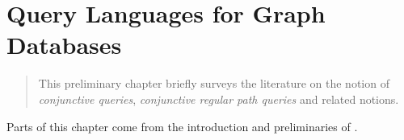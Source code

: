 \chapter{Query Languages for Graph Databases}
\label{ch:prelim-graph-databases}
\renewcommand\thefigure{\thechapter.\arabic{figure}}

\begin{chapterpresentation}
	\begin{abstract}
		This preliminary chapter briefly surveys the literature on
		the notion of \emph{conjunctive queries},
		\emph{conjunctive regular path queries} and related notions.

	\end{abstract}
	\par\bigskip\bigskip
	\begin{acknowledgements}
		Parts of this chapter come from the introduction and preliminaries of \cite{FigueiraMorvan2025SemanticTreeWidthLMCS,FigueiraMorvanRomero2025Minimizing}.
	\end{acknowledgements}
	\clearpagepresentation
	\chaptertocstandalone
\end{chapterpresentation}


